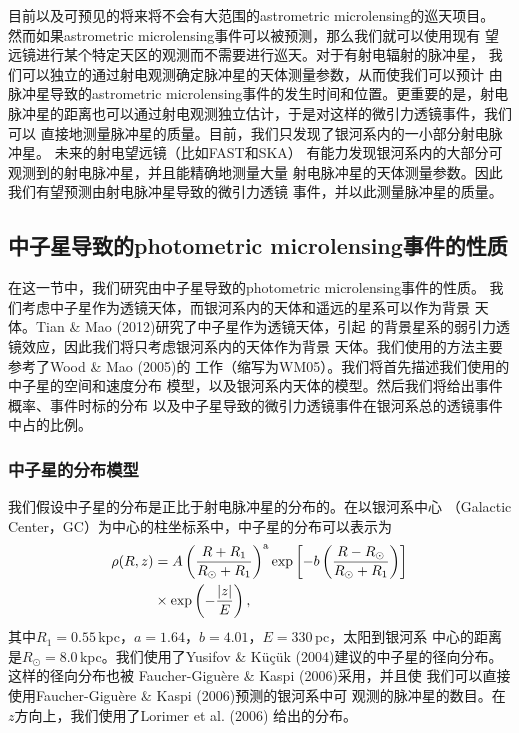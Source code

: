 目前以及可预见的将来将不会有大范围的astrometric microlensing的巡天项目。
然而如果astrometric microlensing事件可以被预测，那么我们就可以使用现有
望远镜进行某个特定天区的观测而不需要进行巡天。对于有射电辐射的脉冲星，
我们可以独立的通过射电观测确定脉冲星的天体测量参数，从而使我们可以预计
由脉冲星导致的astrometric microlensing事件的发生时间和位置。更重要的是，射电
脉冲星的距离也可以通过射电观测独立估计，于是对这样的微引力透镜事件，我们可以
直接地测量脉冲星的质量。目前，我们只发现了银河系内的一小部分射电脉冲星。
未来的射电望远镜（比如FAST\supercite{Nan}和SKA\supercite{Johnston2007}）
有能力发现银河系内的大部分可观测到的射电脉冲星，并且能精确地测量大量
射电脉冲星的天体测量参数。因此我们有望预测由射电脉冲星导致的微引力透镜
事件，并以此测量脉冲星的质量。

\subsection{中子星导致的photometric microlensing事件的性质}

在这一节中，我们研究由中子星导致的photometric microlensing事件的性质。
我们考虑中子星作为透镜天体，而银河系内的天体和遥远的星系可以作为背景
天体。Tian \& Mao (2012)\supercite{Tian}研究了中子星作为透镜天体，引起
的背景星系的弱引力透镜效应，因此我们将只考虑银河系内的天体作为背景
天体。我们使用的方法主要参考了Wood \& Mao (2005)\supercite{Wood}的
工作（缩写为WM05）。我们将首先描述我们使用的中子星的空间和速度分布
模型，以及银河系内天体的模型。然后我们将给出事件概率、事件时标的分布
以及中子星导致的微引力透镜事件在银河系总的透镜事件中占的比例。

\subsubsection{中子星的分布模型}

我们假设中子星的分布是正比于射电脉冲星的分布的。在以银河系中心
（Galactic Center，GC）为中心的柱坐标系中，中子星的分布可以表示为
%
\begin{equation}
\begin{split}
\rho(R,z) & =A\left(\frac{R+R_{1}}{R_{\odot}+R_{1}}\right)^{\rm{a}}\exp\left[-b\left(\frac{R-R_{\odot}}{R_{\odot}+R_{1}}\right)\right]\\
          & \times\exp\left(-\frac{|z|}{E}\right),
\end{split}
\end{equation}
%
其中$R_{1}=0.55$\,kpc，$a=1.64$，$b=4.01$，$E=330$\,pc，太阳到银河系
中心的距离是$R_{\odot}=8.0$\,kpc。我们使用了Yusifov \& K{\"u}{\c c}{\"u}k 
(2004)\supercite{Yusifov}建议的中子星的径向分布。这样的径向分布也被
Faucher-Gigu{\`e}re \& Kaspi (2006)\supercite{Faucher}采用，并且使
我们可以直接使用Faucher-Gigu{\`e}re \& Kaspi (2006)预测的银河系中可
观测的脉冲星的数目。在$z$方向上，我们使用了Lorimer et al. (2006)\supercite{Lorimer06}
给出的分布。


